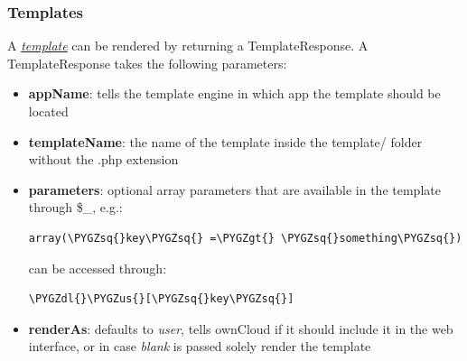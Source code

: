 \documentclass[letterpaper,10pt,english]{sphinxmanual}
\def\PYGZus{\char`\_}
\def\PYGZgt{\char`\>}
\def\PYGZdl{\char`\$}
\def\PYGZsq{\char`\'}
\begin{document}
\subsubsection{Templates}
\label{app/controllers:templates}
A {\hyperref[app/templates::doc]{\emph{template}}} can be rendered by returning a TemplateResponse. A TemplateResponse takes the following parameters:
\begin{itemize}
\item {} 
\textbf{appName}: tells the template engine in which app the template should be located

\item {} 
\textbf{templateName}: the name of the template inside the template/ folder without the .php extension

\item {} 
\textbf{parameters}: optional array parameters that are available in the template through \$\_, e.g.:

\begin{Verbatim}[commandchars=\\\{\}]
array(\PYGZsq{}key\PYGZsq{} =\PYGZgt{} \PYGZsq{}something\PYGZsq{})
\end{Verbatim}

can be accessed through:

\begin{Verbatim}[commandchars=\\\{\}]
\PYGZdl{}\PYGZus{}[\PYGZsq{}key\PYGZsq{}]
\end{Verbatim}

\item {} 
\textbf{renderAs}: defaults to \emph{user}, tells ownCloud if it should include it in the web interface, or in case \emph{blank} is passed solely render the template

\end{itemize}
\end{document}
